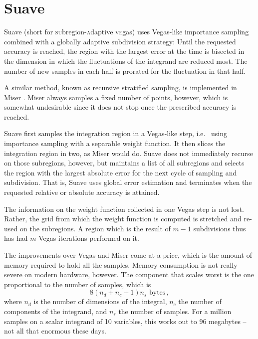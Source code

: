 \documentclass[12pt]{article}
\newcommand\ie{i.e.\ }
\begin{document}

\section{Suave}

Suave (short for \textsc{su}bregion-\textsc{a}daptive \textsc{ve}gas)
uses Vegas-like importance sampling combined with a globally adaptive
subdivision strategy: Until the requested accuracy is reached, the
region with the largest error at the time is bisected in the dimension
in which the fluctuations of the integrand are reduced most.  The number
of new samples in each half is prorated for the fluctuation in that
half.

A similar method, known as recursive stratified sampling, is implemented
in Miser \cite{Miser}.  Miser always samples a fixed number of points,
however, which is somewhat undesirable since it does not stop once the
prescribed accuracy is reached.

Suave first samples the integration region in a Vegas-like step, \ie
using importance sampling with a separable weight function.  It then
slices the integration region in two, as Miser would do.  Suave does not
immediately recurse on those subregions, however, but maintains a list
of all subregions and selects the region with the largest absolute error
for the next cycle of sampling and subdivision.  That is, Suave uses
global error estimation and terminates when the requested relative or
absolute accuracy is attained.

The information on the weight function collected in one Vegas step is
not lost.  Rather, the grid from which the weight function is computed
is stretched and re-used on the subregions.  A region which is the
result of $m - 1$ subdivisions thus has had $m$ Vegas iterations
performed on it.

The improvements over Vegas and Miser come at a price, which is the
amount of memory required to hold all the samples.  Memory consumption
is not really severe on modern hardware, however.  The component that
scales worst is the one proportional to the number of samples, which is
$$
8 (n_d + n_c + 1) n_s\text{ bytes}\,,
$$
where $n_d$ is the number of dimensions of the integral, $n_c$ the
number of components of the integrand, and $n_s$ the number of samples. 
For a million samples on a scalar integrand of 10 variables, this works
out to 96 megabytes -- not all that enormous these days. 
\end{document}
